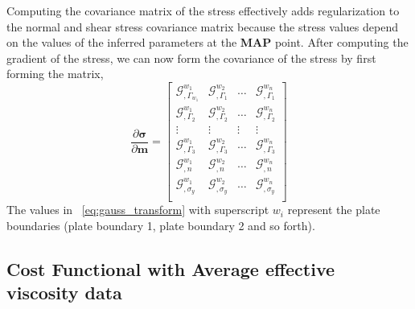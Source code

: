 \documentclass[12pt]{article}
\newcommand{\mm}{{\ensuremath{\boldsymbol{m}}}}
\newcommand{\ssigma}{{\ensuremath{\boldsymbol{\sigma}}}}
\begin{document}
Computing the covariance matrix of the stress effectively adds regularization to the normal and shear stress covariance matrix because the stress values depend on the values of the inferred parameters at the \textbf{MAP} point. After computing the gradient of the stress, we can now form the covariance of the stress by first forming the matrix,
\begin{equation}
\frac{\partial \ssigma}{\partial \mm}=
  \begin{bmatrix}
    \mathcal G^{w_1}_{,\Gamma_{w_1}}  & \mathcal G^{w_2}_{,\Gamma_{1}} & \hdots & \mathcal G^{w_n}_{,\Gamma_{1}} \\
    \mathcal G^{w_1}_{,\Gamma_{2}} & \mathcal G^{w_2}_{,\Gamma_{2}}  &  \hdots & \mathcal G^{w_n}_{,\Gamma_{2}} \\
    \vdots & \vdots & \vdots & \vdots  \\
    \mathcal G^{w_1}_{,\Gamma_{3}} & \mathcal G^{w_2}_{,\Gamma_{3}} &   \hdots & \mathcal G^{w_n}_{,\Gamma_{3}} \\
    \mathcal G^{w_1}_{,n} & \mathcal G^{w_2}_{,n} &  \hdots & \mathcal G^{w_n}_{,n} \\
    \mathcal G^{w_1}_{,\sigma_y} & \mathcal G^{w_2}_{,\sigma_y} &  \hdots & \mathcal G^{w_n}_{,\sigma_y} \\

\end{bmatrix}
\label{eq:gauss_transform}
\end{equation}
The values in ~\eqref{eq:gauss_transform} with superscript $w_i$ represent the  plate boundaries (plate boundary 1, plate boundary 2 and so forth).

\subsection*{Cost Functional with Average effective viscosity data}
\end{document}
